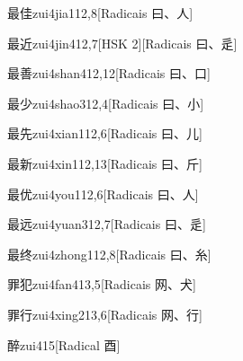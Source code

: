 \begin{entry}{最佳}{zui4jia1}{12,8}[Radicais ⽈、⼈]
\end{entry}

\begin{entry}{最近}{zui4jin4}{12,7}[HSK 2][Radicais ⽈、⾡]
\end{entry}

\begin{entry}{最善}{zui4shan4}{12,12}[Radicais ⽈、⼝]
\end{entry}

\begin{entry}{最少}{zui4shao3}{12,4}[Radicais ⽈、⼩]
\end{entry}

\begin{entry}{最先}{zui4xian1}{12,6}[Radicais ⽈、⼉]
\end{entry}

\begin{entry}{最新}{zui4xin1}{12,13}[Radicais ⽈、⽄]
\end{entry}

\begin{entry}{最优}{zui4you1}{12,6}[Radicais ⽈、⼈]
\end{entry}

\begin{entry}{最远}{zui4yuan3}{12,7}[Radicais ⽈、⾡]
\end{entry}

\begin{entry}{最终}{zui4zhong1}{12,8}[Radicais ⽈、⽷]
\end{entry}

\begin{entry}{罪犯}{zui4fan4}{13,5}[Radicais ⽹、⽝]
\end{entry}

\begin{entry}{罪行}{zui4xing2}{13,6}[Radicais ⽹、⾏]
\end{entry}

\begin{entry}{醉}{zui4}{15}[Radical ⾣]
\end{entry}

